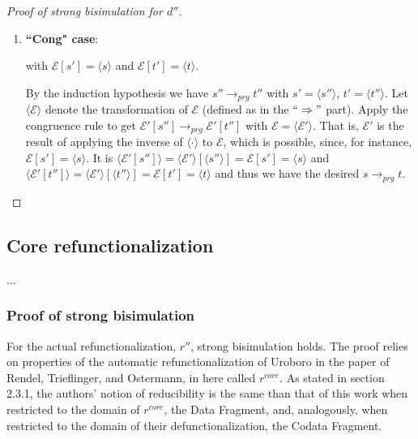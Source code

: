 \begin{proof}[Proof of strong bisimulation for $d''$]
\begin{enumerate}
were $prg'$ a well-typed program with copattern coverage for all subterms of $s$. Both of those properties can be shown or simulated similarly to the way they are in the $`` \Rightarrow "$ part.

But it is $prg' \subseteq prg$, as can be seen in the definition of $d''$. This implies the desired $s \longrightarrow_{prg} t$.

\item \textbf{``Cong" case}:

\begin{prooftree}
\end{prooftree}

with $\mathcal{E}[s'] = \langle s \rangle$ and $\mathcal{E}[t'] = \langle t \rangle$.

By the induction hypothesis we have $s'' \longrightarrow_{prg} t''$ with $s' = \langle s'' \rangle$, $t' = \langle t'' \rangle$. Let $\langle \mathcal{E} \rangle$ denote the transformation of $\mathcal{E}$ (defined as in the $`` \Rightarrow "$ part). Apply the congruence rule to get $\mathcal{E}'[s''] \longrightarrow_{prg} \mathcal{E}'[t'']$ with $\mathcal{E} = \langle \mathcal{E}' \rangle$. That is, $\mathcal{E}'$ is the result of applying the inverse of $\langle \cdot \rangle$ to $\mathcal{E}$, which is possible, since, for instance, $\mathcal{E}[s'] = \langle s \rangle$. It is $\langle \mathcal{E}'[s''] \rangle = \langle \mathcal{E}' \rangle[\langle s'' \rangle] = \mathcal{E}[s'] = \langle s \rangle$ and $\langle \mathcal{E}'[t''] \rangle = \langle \mathcal{E}' \rangle[\langle t'' \rangle] = \mathcal{E}[t'] = \langle t \rangle$ and thus we have the desired $s \longrightarrow_{prg} t$.
\end{enumerate}

\end{proof}

\subsection{Core refunctionalization}

...

\subsubsection{Proof of strong bisimulation}

For the actual refunctionalization, $r''$, strong bisimulation holds. The proof relies on properties of the automatic refunctionalization of Uroboro in the paper of Rendel, Trieflinger, and Ostermann, in here called $r^{core}$. As stated in section 2.3.1, the authors' notion of reducibility is the same than that of this work when restricted to the domain of $r^{core}$, the Data Fragment, and, analogously, when restricted to the domain of their defunctionalization, the Codata Fragment.

